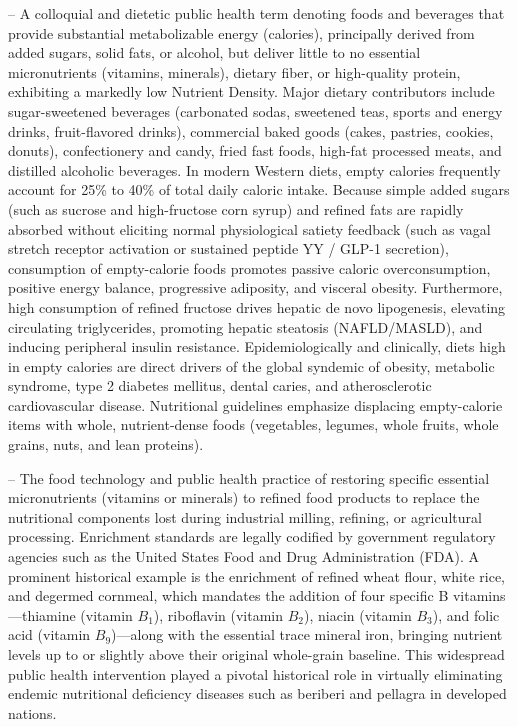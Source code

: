 -- A colloquial and dietetic public health term denoting foods and beverages that provide substantial metabolizable energy (calories), principally derived from added sugars, solid fats, or alcohol, but deliver little to no essential micronutrients (vitamins, minerals), dietary fiber, or high-quality protein, exhibiting a markedly low Nutrient Density. Major dietary contributors include sugar-sweetened beverages (carbonated sodas, sweetened teas, sports and energy drinks, fruit-flavored drinks), commercial baked goods (cakes, pastries, cookies, donuts), confectionery and candy, fried fast foods, high-fat processed meats, and distilled alcoholic beverages. In modern Western diets, empty calories frequently account for 25\% to 40\% of total daily caloric intake. Because simple added sugars (such as sucrose and high-fructose corn syrup) and refined fats are rapidly absorbed without eliciting normal physiological satiety feedback (such as vagal stretch receptor activation or sustained peptide YY / GLP-1 secretion), consumption of empty-calorie foods promotes passive caloric overconsumption, positive energy balance, progressive adiposity, and visceral obesity. Furthermore, high consumption of refined fructose drives hepatic de novo lipogenesis, elevating circulating triglycerides, promoting hepatic steatosis (NAFLD/MASLD), and inducing peripheral insulin resistance. Epidemiologically and clinically, diets high in empty calories are direct drivers of the global syndemic of obesity, metabolic syndrome, type 2 diabetes mellitus, dental caries, and atherosclerotic cardiovascular disease. Nutritional guidelines emphasize displacing empty-calorie items with whole, nutrient-dense foods (vegetables, legumes, whole fruits, whole grains, nuts, and lean proteins).

-- The food technology and public health practice of restoring specific essential micronutrients (vitamins or minerals) to refined food products to replace the nutritional components lost during industrial milling, refining, or agricultural processing. Enrichment standards are legally codified by government regulatory agencies such as the United States Food and Drug Administration (FDA). A prominent historical example is the enrichment of refined wheat flour, white rice, and degermed cornmeal, which mandates the addition of four specific B vitamins---thiamine (vitamin $B_1$), riboflavin (vitamin $B_2$), niacin (vitamin $B_3$), and folic acid (vitamin $B_9$)---along with the essential trace mineral iron, bringing nutrient levels up to or slightly above their original whole-grain baseline. This widespread public health intervention played a pivotal historical role in virtually eliminating endemic nutritional deficiency diseases such as beriberi and pellagra in developed nations.

